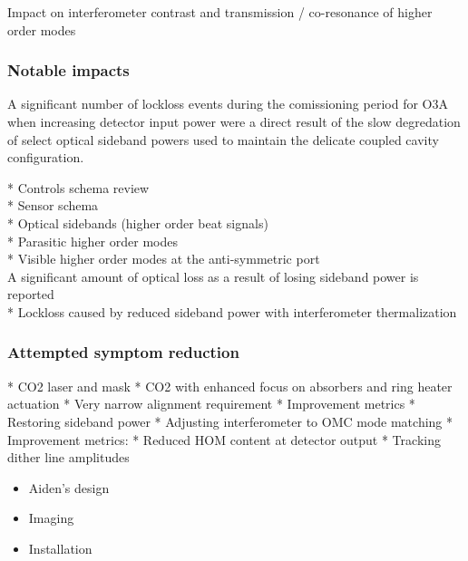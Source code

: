 Impact on interferometer contrast and transmission / co-resonance of higher order modes

\subsubsection{Notable impacts}
A significant number of lockloss events during the comissioning period for O3A when increasing detector input power were a direct result of the slow degredation of select optical sideband powers used to maintain the delicate coupled cavity configuration.


	* Controls schema review \\
		* Sensor schema \\
		* Optical sidebands (higher order beat signals) \\
	* Parasitic higher order modes \\
		* Visible higher order modes at the anti-symmetric port \\
A significant amount of optical loss as a result of losing sideband power is reported \\
	* Lockloss caused by reduced sideband power with interferometer thermalization \\

\subsubsection{Attempted symptom reduction}
	* CO2 laser and mask
		* CO2 with enhanced focus on absorbers and ring heater actuation
		* Very narrow alignment requirement
		* Improvement metrics
			* Restoring sideband power	
	* Adjusting interferometer to OMC mode matching
		* Improvement metrics:
			* Reduced HOM content at detector output
			* Tracking dither line amplitudes

\begin{itemize}
\item Aiden's design
\item Imaging
\item Installation

\end{itemize}

